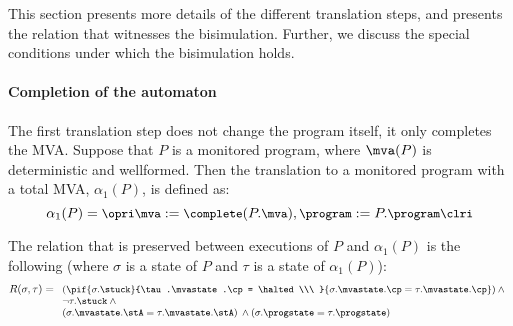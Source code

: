 This section presents more details of the different translation steps,
and presents the relation that witnesses the bisimulation.  Further,
we discuss the special conditions under which the bisimulation holds.



\paragraph{Completion of the automaton}
The first translation step does not change the program itself, it only
completes the MVA. Suppose that \(P\) is a monitored program, where
\(\mva(P)\) is deterministic and wellformed. Then the translation to a
monitored program with a total MVA, \(\alpha_1(P)\), is defined as:
\[{\small
\alpha_1(P) = \opri \mva := \complete(P.\mva), \program := P.\program
\clri
}
\]

The relation that is preserved between executions of \(P\) and
\(\alpha_1(P)\) is the following (where \(\sigma\) is a state of
\(P\) and \(\tau\) is a state of \(\alpha_1(P)\)):
\[{\small
R(\sigma, \tau) =\\
 \begin{array}[t]{l}
  (\pif {\sigma.\stuck}{\tau.\mvastate.\cp = \halted\\\ }
        {\sigma.\mvastate.\cp = \tau.\mvastate.\cp}) \:\wedge \\
  \neg \tau.\stuck \:\wedge\\
  (\sigma.\mvastate.\stA = \tau.\mvastate.\stA) \:\wedge
  (\sigma.\progstate = \tau.\progstate)
\end{array}}
\]

